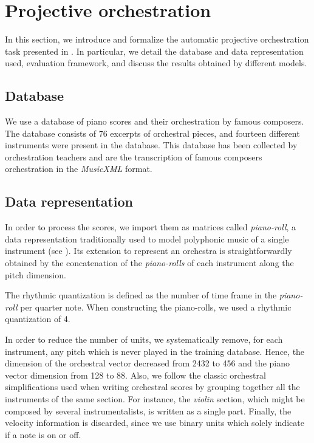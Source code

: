 \documentclass{article}
\begin{document}
\section{Projective orchestration}
In this section, we introduce and formalize the automatic projective orchestration task presented in . In particular, we detail the database and data representation used, evaluation framework, and discuss the results obtained by different models.

\subsection{Database}
We use a database of piano scores and their orchestration by famous composers. The database consists of 76 excerpts of orchestral pieces, and fourteen different instruments were present in the database. This database has been collected by orchestration teachers and are the transcription of famous composers orchestration in the \textit{MusicXML} format.

\subsection{Data representation}
In order to process the scores, we import them as matrices called \textit{piano-roll}, a data representation traditionally used to model polyphonic music of a single instrument (see ). 
Its extension to represent an orchestra is straightforwardly obtained by the concatenation of the \textit{piano-rolls} of each instrument along the pitch dimension.

The rhythmic quantization is defined as the number of time frame in the \textit{piano-roll} per quarter note. When constructing the piano-rolls, we used a rhythmic quantization of 4.

In order to reduce the number of units, we systematically remove, for each instrument, any pitch which is never played in the training database. Hence, the dimension of the orchestral vector decreased from 2432 to 456 and the piano vector dimension from 128 to 88.
Also, we follow the classic orchestral simplifications used when writing orchestral scores by grouping together all the instruments of the same section. For instance, the \textit{violin} section, which might be composed by several instrumentalists, is written as a single part.
Finally, the velocity information is discarded, since we use binary units which solely indicate if a note is on or off.
\end{document}
